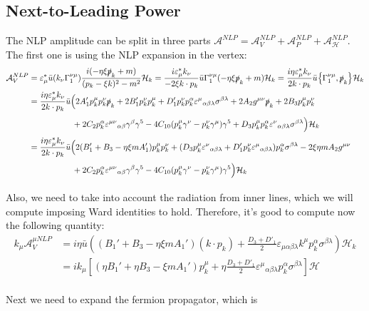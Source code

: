 \documentclass{article}
\newcommand{\s}[1]{\slashed #1}
\begin{document}
\subsection{Next-to-Leading Power}
The NLP amplitude can be split in three parts $\mathcal{A}^{NLP} = \mathcal{A}^{NLP}_V + \mathcal{A}^{NLP}_P + \mathcal{A}^{NLP}_{\mathcal{H}}$.
The first one is using the NLP expansion in the vertex:
\begin{align*}
	\mathcal{A}^{NLP}_V &= \varepsilon^*_\mu\bar{u}(k_\nu\Gamma_1^{\nu\mu})\frac{i(-\eta\xi\s{p}_k + m)}{(p_k - \xi k)^2 - m^2} \mathcal{H}_k
	= \frac{i\varepsilon^*_\mu k_\nu}{-2\xi k\cdot p_k}\bar{u}\Gamma_1^{\nu\mu}(-\eta\xi\s{p}_k + m) \mathcal{H}_k
	= \frac{i\eta\varepsilon^*_\mu k_\nu}{2k\cdot p_k}\bar{u}\acomm{\Gamma_1^{\nu\mu}}{\s{p}_k} \mathcal{H}_k\\&
	= \frac{i\eta\varepsilon^*_\mu k_\nu}{2k\cdot p_k}\bar{u}\Big(2A_1'p_k^\mu p_k^\nu \s{p}_k + 2 B_1' p_k^\nu p_k^\mu + D_1' p_k^\nu p_k^\alpha \varepsilon^{\mu}{}_{\alpha\beta\lambda}\sigma^{\beta\lambda} + 2A_2 g^{\mu\nu}\s{p}_k + 2B_3 p_k^\mu p_k^\nu\\&\phantom{=\frac{i\varepsilon^*_\mu k_\nu}{2k\cdot p_k}\bar{u}\Big(} + 2C_2p^\alpha_k\varepsilon^{\mu\nu}{}_{\alpha\beta}\gamma^\beta \gamma^5 - 4C_{10}(p_k^\mu\gamma^\nu - p_k^\nu\gamma^\mu) \gamma^5 + D_3 p_k^\mu p_k^\alpha \varepsilon^{\nu}{}_{\alpha\beta\lambda}\sigma^{\beta\lambda}\Big) \mathcal{H}_k\\&
	= \frac{i\eta\varepsilon^*_\mu k_\nu}{2k\cdot p_k}\bar{u}\Big(2(B_1'+B_3-\eta\xi mA_1')p_k^\mu p_k^\nu + (D_3 p_k^\mu \varepsilon^{\nu}{}_{\alpha\beta\lambda} + D_1' p_k^\nu \varepsilon^{\mu}{}_{\alpha\beta\lambda}) p_k^\alpha \sigma^{\beta\lambda} - 2\xi\eta mA_2 g^{\mu\nu} \\&\phantom{= \frac{i\varepsilon^*_\mu k_\nu}{2k\cdot p_k}\bar{u}\Big(} + 2C_2p^\alpha_k\varepsilon^{\mu\nu}{}_{\alpha\beta}\gamma^\beta \gamma^5 - 4C_{10}(p_k^\mu\gamma^\nu - p_k^\nu\gamma^\mu) \gamma^5\Big) \mathcal{H}_k
\end{align*}

Also, we need to take into account the radiation from inner lines, which we will compute imposing Ward identities to hold. Therefore, it's good to compute now the following quantity:
\begin{align*}
	k_\mu\mathcal{A}^{\mu NLP}_V &
	= i\eta\bar{u}\left((B_1'+B_3-\eta\xi mA_1')(k\cdot p_k) + \frac{D_3+D'_1}{2} \varepsilon_{\mu\alpha\beta\lambda} k^\mu p_k^\alpha \sigma^{\beta\lambda}\right) \mathcal{H}_k\\&
	= ik_\mu\left[\left(\eta B_1'+\eta B_3-\xi mA_1'\right) p_k^\mu + \eta\frac{D_3+D'_1}{2} \varepsilon^{\mu}{}_{\alpha\beta\lambda} p_k^\alpha \sigma^{\beta\lambda}\right]\mathcal{H}
\end{align*}
\\
Next we need to expand the fermion propagator, which is
\end{document}
